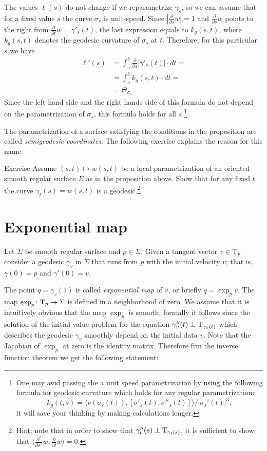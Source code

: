 The values $\ell(s)$ do not change if we reparametrize $\gamma_s$,
so we can assume that for a fixed value $s$ the curve $\sigma_s$ is unit-speed.
Since $|\tfrac{\partial}{\partial s}w|=1$ and $\tfrac{\partial}{\partial s}w$ points to the right from $\tfrac{\partial}{\partial t}w=\gamma'_s(t)$, the last expression equals to $k_g(s,t)$,
where $k_g(s,t)$ denotes the geodesic curvature of $\sigma_s$ at $t$. 
Therefore, for this particular $s$ we have
\begin{align*}
\ell'(s)&= \int_a^b \tfrac \partial {\partial s} |\gamma'_s(t)|\cdot dt =
\\
&= \int_a^b k_g(s,t)\cdot dt=
\\
&=\Theta_{\sigma_s}.
\end{align*}
Since the left hand side and the right hands side of this formula do not depend on the parametrization of $\sigma_s$, this formula holds for all $s$.\footnote{One may avid passing the a unit speed parametrization by using the following formula for geodesic curvature which holds for any regular parametrization: 
\[k_g(t,s)=\langle \nu(\sigma_s(t)),[\sigma'_s(t),\sigma''_s(t)]\rangle/|\sigma_s'(t)|^3;\]
it will save your thinking by making calculations longer.}
\qeds

The parametrization of a surface satisfying the conditions in the proposition are called \emph{semigeodesic coordinates}.
The following exercise explains the reason for this name.

\begin{thm}{Exercise}
Assume $(s,t)\mapsto w(s,t)$ be a local parametrization of an oriented smooth regular surface $\Sigma$ as in the proposition above.
Show that for any fixed $t$ the curve $\gamma_t(s)= w(s,t)$ is a geodesic.\footnote{Hint: note that in order to show that $\gamma''_t(s)\perp\mathrm{T}_{\gamma_t(s)}$, it is sufficient to show that $\langle\tfrac{\partial^2}{\partial s^2}w,\tfrac{\partial}{\partial t}w\rangle=0$.}
\end{thm}


\section{Exponential map}

Let $\Sigma$ be smooth regular surface and $p\in \Sigma$.
Given a tangent vector $v\in \mathrm{T}_p$ consider a geodesic $\gamma_v$ in $\Sigma$ that runs from $p$ with the initial velocity $v$;  
that is, $\gamma(0)=p$ and $\gamma'(0)=v$.

The point $q=\gamma_v(1)$ is called \emph{exponential map} of $v$, or briefly $q=\exp_pv$.
The map $\exp_p\colon\mathrm{T}_p\to \Sigma$ is defined in a neighborhood of zero.
We assume that it is intuitively obvious that the map $\exp_p$ is smooth;
formally it follows since the solution of the initial value problem for the equation $\gamma_v''(t)\perp\mathrm{T}_{\gamma_v(t)}$ which describes the geodesic $\gamma_v$ smoothly depend on the initial data $v$.
Note that the Jacobian of $\exp_p$ at zero is the identity matrix.
Therefore frm the inverse function theorem we get the following statement:

